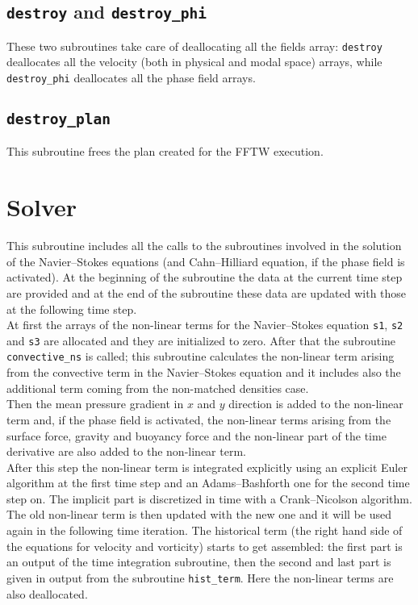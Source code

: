 \subsection{\texttt{destroy} and \texttt{destroy\_phi}}
These two subroutines take care of deallocating all the fields array: \texttt{destroy} deallocates all the velocity (both in physical and modal space) arrays, while \texttt{destroy\_phi} deallocates all the phase field arrays.

\subsection{\texttt{destroy\_plan}}
This subroutine frees the plan created for the FFTW execution.

\section{Solver}
\label{sec: solver}
This subroutine includes all the calls to the subroutines involved in the solution of the Navier--Stokes equations (and Cahn--Hilliard equation, if the phase field is activated). At the beginning of the subroutine the data at the current time step are provided and at the end of the subroutine these data are updated with those at the following time step.\\
At first the arrays of the non-linear terms for the Navier--Stokes equation \texttt{s1}, \texttt{s2} and \texttt{s3} are allocated and they are initialized to zero. After that the subroutine \texttt{convective\_ns} is called; this subroutine calculates the non-linear term arising from the convective term in the Navier--Stokes equation and it includes also the additional term coming from the non-matched densities case.\\
Then the mean pressure gradient in $x$ and $y$ direction is added to the non-linear term and, if the phase field is activated, the non-linear terms arising from the surface force, gravity and buoyancy force and the non-linear part of the time derivative are also added to the non-linear term.\\
After this step the non-linear term is integrated explicitly using an explicit Euler algorithm at the first time step and an Adams--Bashforth one for the second time step on. The implicit part is discretized in time with a Crank--Nicolson algorithm.\\
The old non-linear term is then updated with the new one and it will be used again in the following time iteration. The historical term (the right hand side of the equations for velocity and vorticity) starts to get assembled: the first part is an output of the time integration subroutine, then the second and last part is given in output from the subroutine \texttt{hist\_term}. Here the non-linear terms are also deallocated.\\
